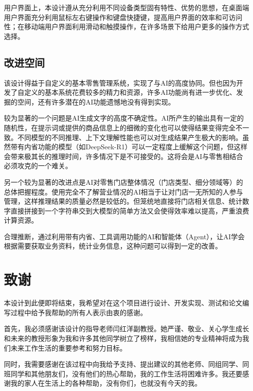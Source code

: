 用户界面上，本设计遵从充分利用不同设备类型固有特性、优势的思想，在桌面端用户界面充分利用鼠标左右键操作和键盘快捷键，提高用户界面的效率和可访问性；在移动端用户界面利用滑动和触摸操作，在许多场景下给用户更多的操作方式选择。

\subsection{改进空间}

该设计得益于自定义的基本零售管理系统，实现了与AI的高度协同。但也因为开发了自定义的基本系统花费较多的精力和资源，许多AI功能尚有进一步优化、发掘的空间，还有许多潜在的AI功能遗憾地没有得到实现。

较为显著的一个问题是AI生成文字的高度不确定性。AI所产生的输出具有一定的随机性，在提示词或提供的商品信息上的细微的变化也可以使得结果变得完全不一致。不同模型的不同推理、上下文理解性能也可以对生成结果产生极大的影响。虽然带有内省功能的模型（如DeepSeek-R1）可以一定程度上缓解这个问题，但这样会带来极其长的推理时间，许多情况下是不可接受的。这将会是AI与零售相结合必须攻克的一个难关。

另一个较为显著的改进点是AI对零售门店整体情况（门店类型、细分领域等）的总体把握程度。使用完全不了解营业情况的AI相当于让对门店一无所知的人参与管理，这样推理结果的质量必然是较低的。但笼统地直接将门店相关信息、统计数字直接拼接到一个字符串交到大模型的简单方法又会使得效率难以提高，严重浪费计算资源。

合理推断，通过利用带有内省、工具调用功能的AI和智能体（Agent），让AI学会根据需要获取业务资料，统计业务信息，这种问题可以得到一定的改善。

\printbibliography[heading=bibintoc]

\section*{致谢}

本设计到此便即将结束，我希望对在这个项目进行设计、开发实现、测试和论文编写过程中给予我帮助的所有人表示由衷的感谢。

首先，我必须感谢该设计的指导老师闫红洋副教授。她严谨、敬业、关心学生成长和未来的教授形象为我和许多其他同学树立了榜样，我相信她的专业精神将成为我们未来工作生活的重要参考和努力目标。

同时，我需要感谢在该过程中向我给予支持、提出建议的其他老师、同组同学、同班同学和其他朋友们，没有他们的热心帮助，我的工作生活将困难许多。我还要感谢我的家人在生活上的各种帮助，没有你们，也就没有今天的我。